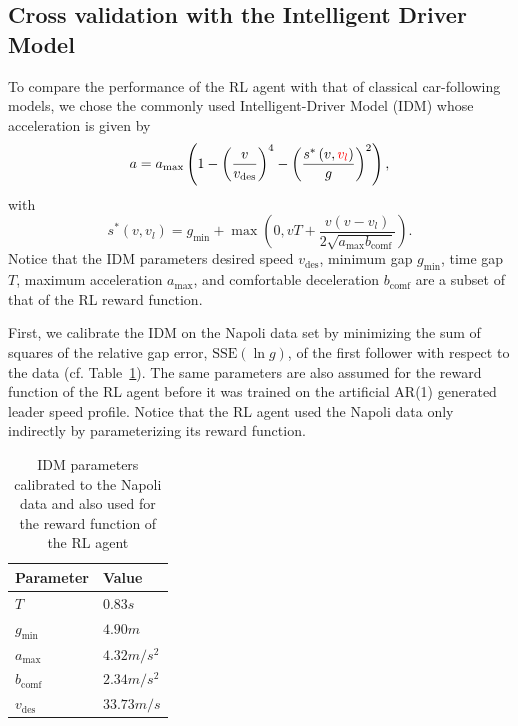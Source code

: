 \documentclass[review]{elsarticle}
\providecommand{\red}[1]{\textcolor{red}{#1}}
\providecommand{\martin}[1]{\red{#1}} %
\providecommand{\sub}[1]{_{\mathrm{#1}}}  %
\providecommand{\3}{{\ss}}
\begin{document}
\subsection{Cross validation with the Intelligent Driver Model}
\label{sec:crossValIDM}
To compare the performance of the RL agent with that of
classical car-following models, we chose the commonly used
Intelligent-Driver Model (IDM)\cite{Opus} whose acceleration is given
by 
\begin{equation}
\label{eq:IDM}
a=a\sub{max}\left(1-\left(\frac{v}{v\sub{des}}\right)^{4}-\left(\frac{s^{*}\left(v, \martin{v_l}\right)}{g}\right)^{2}\right),
\end{equation}
with
\begin{equation}
\label{eq:IDMsstar}
s^{*}\left(v, v_l\right)=g\sub{min}+\max \left(0,vT+\frac{v(v-v_l)}{2 \sqrt{a\sub{max} b\sub{comf}}}\right).
\end{equation}
Notice that the IDM parameters desired
speed $v\sub{des}$, minimum gap $g\sub{min}$, time gap $T$, maximum
acceleration $a\sub{max}$, and
comfortable deceleration $b\sub{comf}$ are a subset of that of the RL reward
function. 

First, we calibrate the IDM on the Napoli data set by
minimizing the sum of squares of the relative gap error,
$\mathrm{SSE}(\ln g)$, of the first follower with respect to the
data (cf. Table~\ref{tab:IDMparameters}). The same parameters are also
assumed for the reward function of the RL agent before it was trained
on the artificial AR(1) generated leader speed profile. Notice that the RL agent used the Napoli data only
indirectly by parameterizing its reward function.

\begin{table}
	\caption{IDM parameters calibrated to the Napoli
            data and also used for the reward function of the RL agent}
	\label{tab:IDMparameters} 
	\begin{center}
		\begin{tabular}{ p{} |p{}  } 
		Parameter & Value   \\ \hline
			$T$ & $0.83s$\\
			$g\sub{min}$ & $4.90m$\\
			$a\sub{max}$ & $4.32m/s^2$\\
			$b\sub{comf}$ & $2.34 m/s^2$\\
			$v\sub{des}$ & $33.73m/s$
			
		\end{tabular}
	\end{center}
\end{table}
\end{document}
